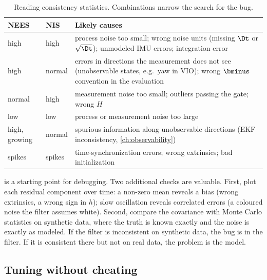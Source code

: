 \begin{table}[t]
\centering\small
\begin{tabularx}{\textwidth}{@{}l l X@{}}
\toprule
\textbf{NEES} & \textbf{NIS} & \textbf{Likely causes} \\
\midrule
high & high & process noise too small; wrong noise units (missing $\Dt$ or $\sqrt{\Dt}$); unmodeled IMU errors; integration error \\
high & normal & errors in directions the measurement does not see (unobservable states, e.g.\ yaw in VIO); wrong $\bminus$ convention in the evaluation \\
normal & high & measurement noise too small; outliers passing the gate; wrong $H$ \\
low & low & process or measurement noise too large \\
high, growing & normal & spurious information along unobservable directions (EKF inconsistency, \cref{ch:observability}) \\
spikes & spikes & time-synchronization errors; wrong extrinsics; bad initialization \\
\bottomrule
\end{tabularx}
\caption{Reading consistency statistics. Combinations narrow the search for the bug.}
\label{tab:consistency-diagnosis}
\end{table}

 is a starting point for debugging. Two additional checks are valuable. First, plot each
residual component over time: a non-zero mean reveals a bias (wrong extrinsics, a wrong sign in $h$); slow oscillation
reveals correlated errors (a coloured noise the filter assumes white). Second, compare the covariance with Monte
Carlo statistics on synthetic data, where the truth is known exactly and the noise is exactly as modeled. If the filter
is inconsistent on synthetic data, the bug is in the filter. If it is consistent there but not on real data, the problem is
the model.

\subsection{Tuning without cheating}

